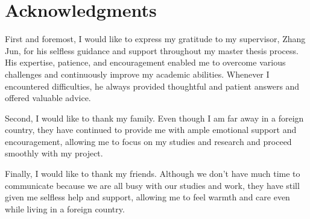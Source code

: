 \chapter{Acknowledgments}

First and foremost, I would like to express my gratitude to my supervisor, Zhang Jun, for his selfless guidance and support throughout my master thesis process. His expertise, patience, and encouragement enabled me to overcome various challenges and continuously improve my academic abilities. Whenever I encountered difficulties, he always provided thoughtful and patient answers and offered valuable advice. 

\noindent
Second, I would like to thank my family. Even though I am far away in a foreign country, they have continued to provide me with ample emotional support and encouragement, allowing me to focus on my studies and research and proceed smoothly with my project. 

\noindent
Finally, I would like to thank my friends. Although we don't have much time to communicate because we are all busy with our studies and work, they have still given me selfless help and support, allowing me to feel warmth and care even while living in a foreign country.

\cleardoublepage
